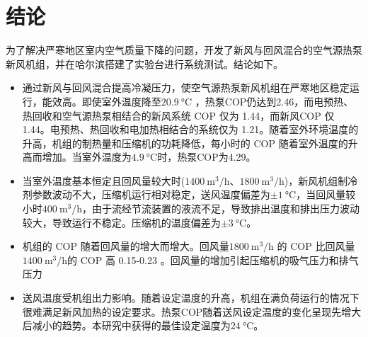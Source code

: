 \section{结论}
为了解决严寒地区室内空气质量下降的问题，开发了新风与回风混合的空气源热泵新风机组，并在哈尔滨搭建了实验台进行系统测试。结论如下。

\begin{itemize}
	\item 通过新风与回风混合提高冷凝压力，使空气源热泵新风机组在严寒地区稳定运行，能效高。即使室外温度降至$\qty{20.9}{\degreeCelsius} $ ，热泵COP仍达到2.46，而电预热、热回收和空气源热泵相结合的新风系统 COP 仅为 1.44，而新风COP 仅 1.44。电预热、热回收和电加热相结合的系统仅为 1.21。随着室外环境温度的升高，机组的制热量和压缩机的功耗降低，每小时的 COP 随着室外温度的升高而增加。当室外温度为$\qty{4.9}{\degreeCelsius} $时，热泵COP为4.29。
	\item 当室外温度基本恒定且回风量较大时($\qty{1400}{\m^3/\hour} $、$\qty{1800}{\m^3/\hour} $)，新风机组制冷剂参数波动不大，压缩机运行相对稳定，送风温度偏差为$\pm \qty{1}{\degreeCelsius} $，当回风量较小时$\qty{400}{\m^3/\hour} $，由于流经节流装置的液流不足，导致排出温度和排出压力波动较大，导致运行不稳定。压缩机的温度偏差为$\pm \qty{3}{\degreeCelsius} $。
	\item 机组的 COP 随着回风量的增大而增大。回风量$\qty{1800}{\m^3/\hour} $ 的 COP 比回风量$\qty{1400}{\m^3/\hour} $的 COP 高 0.15-0.23 。回风量的增加引起压缩机的吸气压力和排气压力
	\item 送风温度受机组出力影响。随着设定温度的升高，机组在满负荷运行的情况下很难满足新风加热的设定要求。热泵COP随着送风设定温度的变化呈现先增大后减小的趋势。本研究中获得的最佳设定温度为$\qty{24}{\degreeCelsius} $。
\end{itemize}
